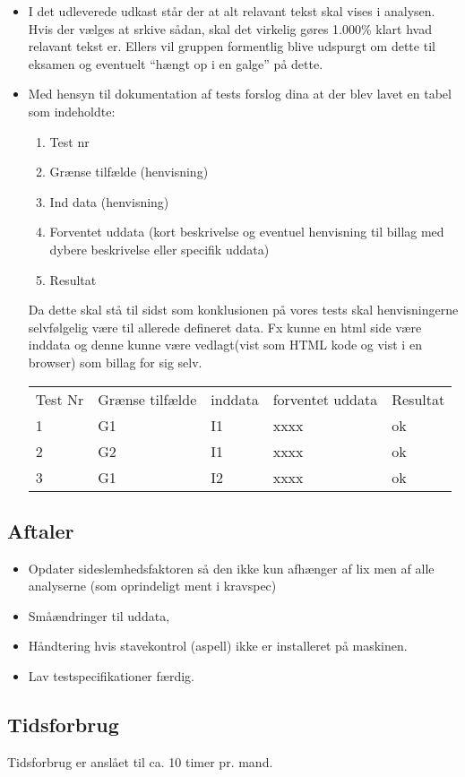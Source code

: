 \documentclass[a4paper,10pt,draft]{article}
\begin{document}
\begin{itemize}
\item I det udleverede udkast står der at alt relavant tekst skal vises i analysen. Hvis der vælges at srkive sådan, skal det virkelig gøres 1.000\% klart hvad relavant tekst er. Ellers vil gruppen formentlig blive udspurgt om dette til eksamen og eventuelt ``hængt op i en galge'' på dette.

\item Med hensyn til dokumentation af tests forslog dina at der blev lavet en tabel som indeholdte: 
\begin{enumerate}
 \item Test nr
\item Grænse tilfælde (henvisning)
\item Ind data (henvisning)
\item Forventet uddata (kort beskrivelse og eventuel henvisning til billag med dybere beskrivelse eller specifik uddata)
\item Resultat
\end{enumerate}

Da dette skal stå til sidst som konklusionen på vores tests skal henvisningerne selvfølgelig være til allerede defineret data. Fx kunne en html side være inddata og denne kunne være vedlagt(vist som HTML kode og vist i en browser) som billag for sig selv.

\begin{center}
\begin{tabular}{lllll}
Test Nr & Grænse tilfælde & inddata & forventet uddata & Resultat \\ 
1 & G1 & I1 & xxxx & ok \\ 
2 & G2 & I1 & xxxx & ok \\ 
3 & G1 & I2 & xxxx & ok
\end{tabular}
\end{center}

\end{itemize}

\subsection{Aftaler}

\begin{itemize}
 \item Opdater sideslemhedsfaktoren så den ikke kun afhænger af lix men af alle analyserne (som oprindeligt ment i kravspec)
\item Småændringer til uddata,
\item Håndtering hvis stavekontrol (aspell) ikke er installeret på maskinen.
\item Lav testspecifikationer færdig.
\end{itemize}

\subsection{Tidsforbrug}
Tidsforbrug er anslået til ca. 10 timer pr. mand.
\end{document}
